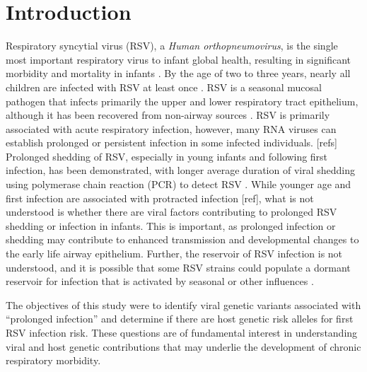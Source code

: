 \documentclass{article} %
\begin{document}
\section{Introduction}
Respiratory syncytial virus (RSV), a \textit{Human orthopneumovirus}, is the single most important respiratory virus to infant global health, resulting in significant morbidity and mortality in infants 
\citep{hall_burden_2009}.
By the age of two to three years, nearly all children are infected with RSV at least once 
\citep{glezen_risk_1986}.
RSV is a seasonal mucosal pathogen that infects primarily the upper and lower respiratory tract epithelium, although it has been recovered from non-airway sources 
\citep{bokun_respiratory_2019,
cubie_detection_1997,
nadal_isolation_1990,
odonnell_respiratory_1998,
rezaee_respiratory_2011,
rohwedder_detection_1998}.
RSV is primarily associated with acute respiratory infection, however, many RNA viruses can establish prolonged or persistent infection in some infected individuals. [refs] 
Prolonged shedding of RSV, especially in young infants and following first infection, has been demonstrated, with longer average duration of viral shedding using polymerase chain reaction (PCR) to detect RSV 
\citep{munywoki_influence_2015}.
While younger age and first infection are associated with protracted infection [ref], 
what is not understood is whether there are viral factors contributing to prolonged RSV shedding or infection in infants. 
This is important, as prolonged infection or shedding may contribute to enhanced transmission and developmental changes to the early life airway epithelium. 
Further, the reservoir of RSV infection is not understood, 
and it is possible that some RSV strains could populate a dormant reservoir for infection that is activated by seasonal or other influences 
\citep{hobson_persistent_2008}.

The objectives of this study were to identify viral genetic variants associated with ``prolonged infection'' and determine if there are host genetic risk alleles for first RSV infection risk. 
These questions are of fundamental interest in understanding viral and host genetic contributions that may underlie the development of chronic respiratory morbidity.
\end{document}
